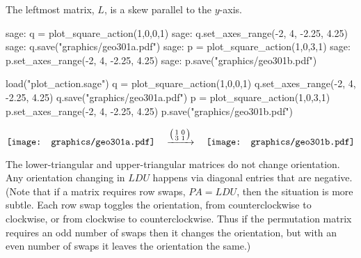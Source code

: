 The leftmost matrix, $L$, is a skew parallel to the $y$-axis.
\begin{sagecommandline}
sage: q = plot_square_action(1,0,0,1) 
sage: q.set_axes_range(-2, 4, -2.25, 4.25) 
sage: q.save("graphics/geo301a.pdf")
sage: p = plot_square_action(1,0,3,1) 
sage: p.set_axes_range(-2, 4, -2.25, 4.25) 
sage: p.save("graphics/geo301b.pdf")
\end{sagecommandline}
\begin{sagesilent}
load("plot_action.sage")
q = plot_square_action(1,0,0,1) 
q.set_axes_range(-2, 4, -2.25, 4.25) 
q.save("graphics/geo301a.pdf")
p = plot_square_action(1,0,3,1) 
p.set_axes_range(-2, 4, -2.25, 4.25) 
p.save("graphics/geo301b.pdf")
\end{sagesilent}
\begin{equation*}
  \vcenteredhbox{\texttt{[image: graphics/geo301a.pdf]}}
  \quad\mapsvia{\big (\begin{smallmatrix} 1 &0 \\ 3 &1 \end{smallmatrix}\big )}\quad
  \vcenteredhbox{\texttt{[image: graphics/geo301b.pdf]}}
\end{equation*}
  
The lower-triangular and upper-triangular matrices do not
change orientation.
Any orientation changing in $LDU$ happens via diagonal entries that are 
negative.
(Note that if a matrix requires row swaps, $PA=LDU$, then the situation is 
more subtle.
Each row swap toggles the orientation, from counterclockwise to clockwise, or
from clockwise to counterclockwise.
Thus
if the permutation matrix requires an odd number of swaps 
then it changes the orientation, 
but with an even number of swaps it leaves the orientation the same.)

